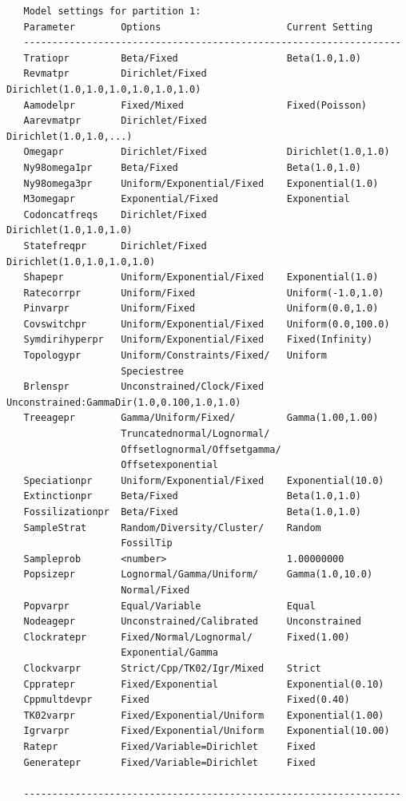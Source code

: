 \documentclass[12pt]{book}
\begin{document}
\begin{singlespacing}
\scriptsize
\begin{verbatim}
   Model settings for partition 1:
   Parameter        Options                      Current Setting
   ------------------------------------------------------------------
   Tratiopr         Beta/Fixed                   Beta(1.0,1.0)
   Revmatpr         Dirichlet/Fixed              Dirichlet(1.0,1.0,1.0,1.0,1.0,1.0)
   Aamodelpr        Fixed/Mixed                  Fixed(Poisson)
   Aarevmatpr       Dirichlet/Fixed              Dirichlet(1.0,1.0,...)
   Omegapr          Dirichlet/Fixed              Dirichlet(1.0,1.0)
   Ny98omega1pr     Beta/Fixed                   Beta(1.0,1.0)
   Ny98omega3pr     Uniform/Exponential/Fixed    Exponential(1.0)
   M3omegapr        Exponential/Fixed            Exponential
   Codoncatfreqs    Dirichlet/Fixed              Dirichlet(1.0,1.0,1.0)
   Statefreqpr      Dirichlet/Fixed              Dirichlet(1.0,1.0,1.0,1.0)
   Shapepr          Uniform/Exponential/Fixed    Exponential(1.0)
   Ratecorrpr       Uniform/Fixed                Uniform(-1.0,1.0)
   Pinvarpr         Uniform/Fixed                Uniform(0.0,1.0)
   Covswitchpr      Uniform/Exponential/Fixed    Uniform(0.0,100.0)
   Symdirihyperpr   Uniform/Exponential/Fixed    Fixed(Infinity)
   Topologypr       Uniform/Constraints/Fixed/   Uniform
                    Speciestree
   Brlenspr         Unconstrained/Clock/Fixed    Unconstrained:GammaDir(1.0,0.100,1.0,1.0)
   Treeagepr        Gamma/Uniform/Fixed/         Gamma(1.00,1.00)
                    Truncatednormal/Lognormal/
                    Offsetlognormal/Offsetgamma/
                    Offsetexponential
   Speciationpr     Uniform/Exponential/Fixed    Exponential(10.0)
   Extinctionpr     Beta/Fixed                   Beta(1.0,1.0)
   Fossilizationpr  Beta/Fixed                   Beta(1.0,1.0)
   SampleStrat      Random/Diversity/Cluster/    Random
                    FossilTip
   Sampleprob       <number>                     1.00000000
   Popsizepr        Lognormal/Gamma/Uniform/     Gamma(1.0,10.0)
                    Normal/Fixed
   Popvarpr         Equal/Variable               Equal
   Nodeagepr        Unconstrained/Calibrated     Unconstrained
   Clockratepr      Fixed/Normal/Lognormal/      Fixed(1.00)
                    Exponential/Gamma
   Clockvarpr       Strict/Cpp/TK02/Igr/Mixed    Strict
   Cppratepr        Fixed/Exponential            Exponential(0.10)
   Cppmultdevpr     Fixed                        Fixed(0.40)
   TK02varpr        Fixed/Exponential/Uniform    Exponential(1.00)
   Igrvarpr         Fixed/Exponential/Uniform    Exponential(10.00)
   Ratepr           Fixed/Variable=Dirichlet     Fixed
   Generatepr       Fixed/Variable=Dirichlet     Fixed

   ------------------------------------------------------------------
\end{verbatim}
\normalsize
\end{singlespacing}
\end{document}
